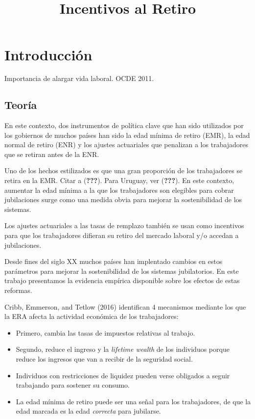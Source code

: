 \documentclass[]{article}
\title{Incentivos al Retiro}
\author{}
\date{\vspace{-2.5em}}
\providecommand{\tightlist}{%
  \setlength{\itemsep}{0pt}\setlength{\parskip}{0pt}}
\begin{document}
\maketitle

{
\setcounter{tocdepth}{3}
\tableofcontents
}
\hypertarget{introducciuxf3n}{%
\section{Introducción}\label{introducciuxf3n}}

Importancia de alargar vida laboral. OCDE 2011.

\hypertarget{teoruxeda}{%
\subsection{Teoría}\label{teoruxeda}}

En este contexto, dos instrumentos de política clave que han sido
utilizados por los gobiernos de muchos países han sido la edad mínima de
retiro (EMR), la edad normal de retiro (ENR) y los ajustes actuariales
que penalizan a los trabajadores que se retiran antes de la ENR.

Uno de los hechos estilizados es que una gran proporción de los
trabajadores se retira en la EMR. Citar a ({\textbf{???}}). Para
Uruguay, ver ({\textbf{???}}). En este contexto, aumentar la edad mínima
a la que los trabajadores son elegibles para cobrar jubilaciones surge
como una medida obvia para mejorar la sostenibilidad de los sistemas.

Los ajustes actuariales a las tasas de remplazo también se usan como
incentivos para que los trabajadores difieran su retiro del mercado
laboral y/o accedan a jubilaciones.

Desde fines del siglo XX muchos países han implentado cambios en estos
parámetros para mejorar la sostenibilidad de los sistemas jubilatorios.
En este trabajo presentamos la evidencia empírica disponible sobre los
efectos de estas reformas.

Cribb, Emmerson, and Tetlow (2016) identifican 4 mecanismos mediante los
que la ERA afecta la actividad económica de los trabajadores:

\begin{itemize}
\tightlist
\item
  Primero, cambia las tasas de impuestos relativas al trabajo.
\item
  Segundo, reduce el ingreso y la \emph{lifetime wealth} de los
  individuos porque reduce los ingresos que van a recibir de la
  seguridad social.
\item
  Individuos con restricciones de liquidez pueden verse obligados a
  seguir trabajando para sostener su consumo.
\item
  La edad mínima de retiro puede ser una señal para los trabajadores, de
  que la edad marcada es la edad \emph{correcta} para jubilarse.
\end{itemize}
\end{document}
